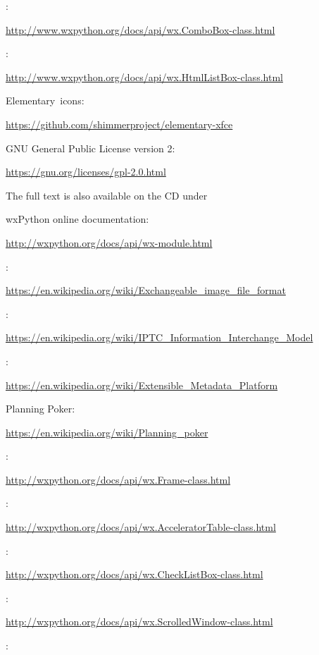 \documentclass[12pt,a4paper,naustrian,english,oneside,openright,DIV=12,BCOR=1cm]{scrbook}
\begin{document}
\begin{thebibliography}{999}
	 :
	
	\url{http://www.wxpython.org/docs/api/wx.ComboBox-class.html}
	
	 :
	
	\url{http://www.wxpython.org/docs/api/wx.HtmlListBox-class.html}

	 Elementary~icons:

	\url{https://github.com/shimmerproject/elementary-xfce}

	 GNU General Public License version 2:
	
	\url{https://gnu.org/licenses/gpl-2.0.html}
	
	
	The full text is also available on the CD under 
	
	 wxPython online documentation:
	
	\url{http://wxpython.org/docs/api/wx-module.html}
	
	 :
	
	\url{https://en.wikipedia.org/wiki/Exchangeable_image_file_format}
	
	 :
	
	\url{https://en.wikipedia.org/wiki/IPTC_Information_Interchange_Model}
	
	 :
	
	\url{https://en.wikipedia.org/wiki/Extensible_Metadata_Platform}
	
	 Planning Poker:
	
	\url{https://en.wikipedia.org/wiki/Planning_poker}
	
	 :
	
	\url{http://wxpython.org/docs/api/wx.Frame-class.html}
	
	 :
	
	\url{http://wxpython.org/docs/api/wx.AcceleratorTable-class.html}
	
	 :
	
	\url{http://wxpython.org/docs/api/wx.CheckListBox-class.html}
	
	 :
	
	\url{http://wxpython.org/docs/api/wx.ScrolledWindow-class.html}
	
	 :
	

\end{thebibliography}
\end{document}

